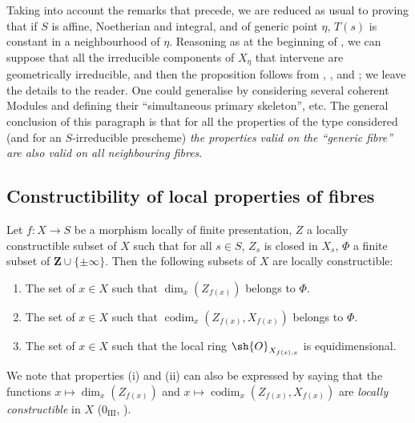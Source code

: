 \begin{remark}[9.8.9]
\medskip
Taking into account the remarks that precede, we are reduced as usual to proving that if $S$ is affine, Noetherian and integral, and of generic point $\eta$, $T(s)$ is constant in a neighbourhood of $\eta$.
Reasoning as at the beginning of , we can suppose that all the irreducible components of $X_\eta$ that intervene are geometrically irreducible, and then the proposition follows from , ,  and ; we leave the details to the reader.
One could generalise by considering several coherent Modules and defining their ``simultaneous primary skeleton'', etc.
The general conclusion of this paragraph is that for all the properties of the type considered (and for an $S$-irreducible prescheme) \emph{the properties valid on the ``generic fibre'' are also valid on all neighbouring fibres}.
\end{remark}

\subsection{Constructibility of local properties of fibres}
\label{subsection:IV.9.9}

\begin{proposition}[9.9.1]
\label{IV.9.9.1}
Let $f:X\to S$ be a morphism locally of finite presentation, $Z$ a locally constructible subset of $X$ such that for all $s\in S$, $Z_s$ is closed in $X_s$, $\Phi$ a finite subset of $\mathbf{Z}\cup\{\pm\infty\}$.
Then the following subsets of $X$ are locally constructible:
\begin{enumerate}[label=(\roman*)]
  \item The set of $x\in X$ such that $\dim_x(Z_{f(x)})$ belongs to $\Phi$.
  \item The set of $x\in X$ such that $\operatorname{codim}_x(Z_{f(x)},X_{f(x)})$ belongs to $\Phi$.
  \item The set of $x\in X$ such that the local ring $\sh{O}_{X_{f(x),x}}$ is equidimensional.
\end{enumerate}

We note that properties (i) and (ii) can also be expressed by saying that the functions $x\mapsto\dim_x(Z_{f(x)})$ and $x\mapsto\operatorname{codim}_x(Z_{f(x)},X_{f(x)})$ are \emph{locally constructible} in $X$ ($0_{\mathrm{III}}$, ).
\end{proposition}

